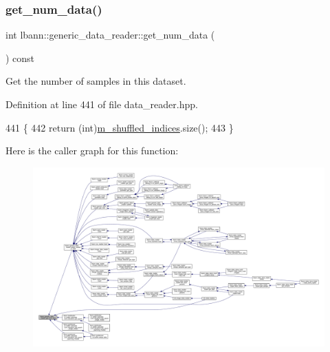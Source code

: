 \subsubsection{\texorpdfstring{get\+\_\+num\+\_\+data()}{get\_num\_data()}}
{\footnotesize\ttfamily int lbann\+::generic\+\_\+data\+\_\+reader\+::get\+\_\+num\+\_\+data (\begin{DoxyParamCaption}{ }\end{DoxyParamCaption}) const\hspace{0.3cm}{\ttfamily [inline]}}



Get the number of samples in this dataset. 



Definition at line 441 of file data\+\_\+reader.\+hpp.


\begin{DoxyCode}
441                            \{
442     \textcolor{keywordflow}{return} (\textcolor{keywordtype}{int})\hyperlink{classlbann_1_1generic__data__reader_aaab6aeff67ffff1c689336851fec2c57}{m\_shuffled\_indices}.size();
443   \}
\end{DoxyCode}
Here is the caller graph for this function\+:\nopagebreak
\begin{figure}[H]
\begin{center}
\leavevmode
\includegraphics[width=350pt]{classlbann_1_1generic__data__reader_adcdb833aff7ce85b0879334b252f357a_icgraph}
\end{center}
\end{figure}
\mbox{\label{classlbann_1_1generic__data__reader_ab35b0f96c84c20b9bab5dda1aa852953}} 
